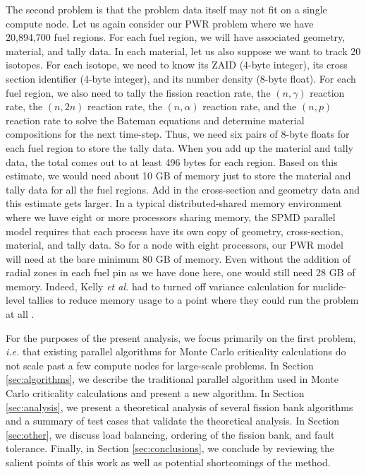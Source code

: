 The second problem is that the problem data itself may not fit on a
single compute node. Let us again consider our PWR problem where we
have 20,894,700 fuel regions. For each fuel region, we will have
associated geometry, material, and tally data. In each material, let
us also suppose we want to track 20 isotopes. For each isotope, we
need to know its ZAID (4-byte integer), its cross section identifier
(4-byte integer), and its number density (8-byte float). For each fuel
region, we also need to tally the fission reaction rate, the
$(n,\gamma)$ reaction rate, the $(n,2n)$ reaction rate, the
$(n,\alpha)$ reaction rate, and the $(n,p)$ reaction rate to solve the
Bateman equations and determine material compositions for the next
time-step. Thus, we need six pairs of 8-byte floats for each fuel
region to store the tally data. When you add up the material and tally
data, the total comes out to at least 496 bytes for each region. Based
on this estimate, we would need about 10 GB of memory just to store
the material and tally data for all the fuel regions. Add in the
cross-section and geometry data and this estimate gets larger. In a
typical distributed-shared memory environment where we have eight or
more processors sharing memory, the SPMD parallel model requires that
each process have its own copy of geometry, cross-section, material,
and tally data. So for a node with eight processors, our PWR model
will need at the bare minimum 80 GB of memory. Even without the
addition of radial zones in each fuel pin as we have done here, one
would still need 28 GB of memory. Indeed, Kelly {\em et al.} had to
turned off variance calculation for nuclide-level tallies to reduce
memory usage to a point where they could run the problem at all
\cite{kelly}.

For the purposes of the present analysis, we focus primarily on the
first problem, {\em i.e.} that existing parallel algorithms for Monte
Carlo criticality calculations do not scale past a few compute nodes
for large-scale problems. In Section \ref{sec:algorithms}, we describe
the traditional parallel algorithm used in Monte Carlo criticality
calculations and present a new algorithm. In Section
\ref{sec:analysis}, we present a theoretical analysis of several
fission bank algorithms and a summary of test cases that validate the
theoretical analysis. In Section \ref{sec:other}, we discuss load
balancing, ordering of the fission bank, and fault tolerance. Finally,
in Section \ref{sec:conclusions}, we conclude by reviewing the salient
points of this work as well as potential shortcomings of the method.

